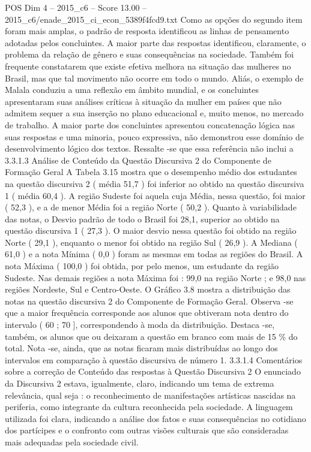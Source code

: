 \begin{textsample}{POS Dim 4 – 2015\_c6 – Score 13.00 – 2015\_c6/enade\_2015\_ci\_econ\_5389f4fcd9.txt}
Como as opções do segundo item foram mais amplas, o padrão de resposta identificou as linhas de pensamento adotadas pelos concluintes.
A maior parte das respostas identificou, claramente, o problema da relação de gênero e suas consequências na sociedade.
Também foi frequente constatarem que existe efetiva melhora na situação das mulheres no Brasil, mas que tal movimento não ocorre em todo o mundo.
Aliás, o exemplo de Malala conduziu a uma reflexão em âmbito mundial, e os concluintes apresentaram suas análises críticas à situação da mulher em países que não admitem sequer a sua inserção no plano educacional e, muito menos, no mercado de trabalho.
A maior parte dos concluintes apresentou concatenação lógica nas suas respostas e uma minoria, pouco expressiva, não demonstrou esse domínio de desenvolvimento lógico dos textos.
Ressalte -se que essa referência não inclui a 3.3.1.3 Análise de Conteúdo da Questão Discursiva 2 do Componente de Formação Geral A Tabela 3.15 mostra que o desempenho médio dos estudantes na questão discursiva 2 ( média 51,7 ) foi inferior ao obtido na questão discursiva 1 ( média 60,4 ).
A região Sudeste foi aquela cuja Média, nessa questão, foi maior ( 52,3 ), e a de menor Média foi a região Norte ( 50,2 ).
Quanto à variabilidade das notas, o Desvio padrão de todo o Brasil foi 28,1, superior ao obtido na questão discursiva 1 ( 27,3 ).
O maior desvio nessa questão foi obtido na região Norte ( 29,1 ), enquanto o menor foi obtido na região Sul ( 26,9 ).
A Mediana ( 61,0 ) e a nota Mínima ( 0,0 ) foram as mesmas em todas as regiões do Brasil.
A nota Máxima ( 100,0 ) foi obtida, por pelo menos, um estudante da região Sudeste.
Nas demais regiões a nota Máxima foi : 99,0 na região Norte ; e 98,0 nas regiões Nordeste, Sul e Centro-Oeste.
O Gráfico 3.8 mostra a distribuição das notas na questão discursiva 2 do Componente de Formação Geral.
Observa -se que a maior frequência corresponde aos alunos que obtiveram nota dentro do intervalo ( 60 ; 70 ], correspondendo à moda da distribuição.
Destaca -se, também, os alunos que ou deixaram a questão em branco com mais de 15 \% do total.
Nota -se, ainda, que as notas ficaram mais distribuídas ao longo dos intervalos em comparação à questão discursiva de número 1. 3.3.1.4 Comentários sobre a correção de Conteúdo das respostas à Questão Discursiva 2 O enunciado da Discursiva 2 estava, igualmente, claro, indicando um tema de extrema relevância, qual seja : o reconhecimento de manifestações artísticas nascidas na periferia, como integrante da cultura reconhecida pela sociedade.
A linguagem utilizada foi clara, indicando a análise dos fatos e suas consequências no cotidiano dos partícipes e o confronto com outras visões culturais que são consideradas mais adequadas pela sociedade civil.

\end{textsample}

